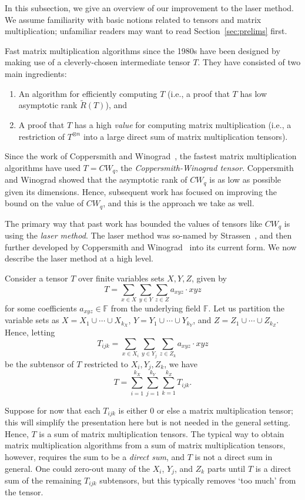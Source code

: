 \PassOptionsToPackage{shortlabels}{enumitem}\documentclass[10pt,a4paper]{article}
\newcommand{\F}{\mathbb{F}}
\begin{document}
In this subsection, we give an overview of our improvement to the laser method. We assume familiarity with basic notions related to tensors and matrix multiplication; unfamiliar readers may want to read Section~\ref{sec:prelims} first.

Fast matrix multiplication algorithms since the 1980s have been designed by making use of a cleverly-chosen intermediate tensor $T$. They have consisted of two main ingredients:
\begin{enumerate}
    \item An algorithm for efficiently computing $T$ (i.e., a proof that $T$ has low asymptotic rank $\tilde{R}(T)$), and
    \item A proof that $T$ has a high \emph{value} for computing matrix multiplication (i.e., a restriction of $T^{\otimes n}$ into a large direct sum of matrix multiplication tensors).
\end{enumerate}
Since the work of Coppersmith and Winograd~\cite{coppersmith}, the fastest matrix multiplication algorithms have used $T=CW_q$, the \emph{Coppersmith-Winograd tensor}. Coppersmith and Winograd showed that the asymptotic rank of $CW_q$ is as low as possible given its dimensions. Hence, subsequent work has focused on improving the bound on the value of $CW_q$, and this is the approach we take as well.

The primary way that past work has bounded the values of tensors like $CW_q$ is using the \emph{laser method}. The laser method was so-named by Strassen~\cite{strassenlaser1}, and then further developed by Coppersmith and Winograd~\cite{coppersmith} into its current form. We now describe the laser method at a high level.

Consider a tensor $T$ over finite variables sets $X,Y,Z$, given by $$T = \sum_{x \in X} \sum_{y \in Y} \sum_{z \in Z} a_{xyz} \cdot x y z$$ for some coefficients $a_{xyz} \in \F$ from the underlying field $\F$. Let us partition the variable sets as $X = X_1 \cup \cdots \cup X_{k_X}$, $Y = Y_1 \cup \cdots \cup Y_{k_Y}$, and $Z = Z_1 \cup \cdots \cup Z_{k_Z}$. Hence, letting $$T_{ijk} = \sum_{x \in X_i} \sum_{y \in Y_j} \sum_{z \in Z_k} a_{xyz} \cdot x y z$$ be the subtensor of $T$ restricted to $X_i,Y_j,Z_k$, we have $$T = \sum_{i=1}^{k_X} \sum_{j=1}^{k_Y} \sum_{k=1}^{k_Z} T_{ijk}.$$

Suppose for now that each $T_{ijk}$ is either $0$ or else a matrix multiplication tensor; this will simplify the presentation here but is not needed in the general setting. Hence, $T$ is a sum of matrix multiplication tensors. The typical way to obtain matrix multiplication algorithms from a sum of matrix multiplication tensors, however, requires the sum to be a {\em direct sum}, and $T$ is not a direct sum in general.
One could zero-out many of the $X_i$, $Y_j$, and $Z_k$ parts until $T$ is a direct sum of the remaining $T_{ijk}$ subtensors, but this typically removes `too much' from the tensor. 
\end{document}
